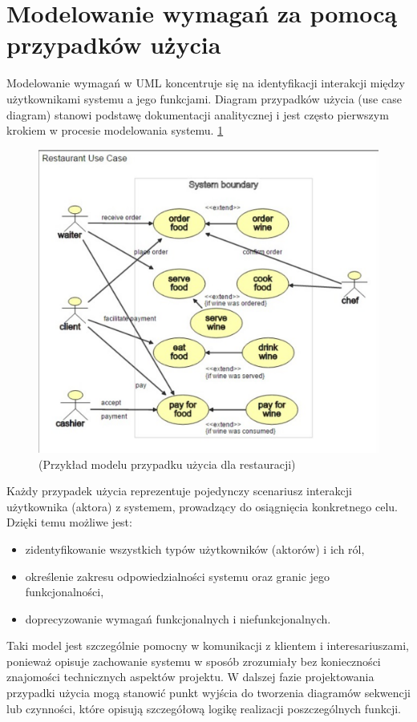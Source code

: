 \documentclass[12pt,a4paper]{article}
\begin{document}
\section{Modelowanie wymagań za pomocą przypadków użycia}

Modelowanie wymagań w UML koncentruje się na identyfikacji interakcji między użytkownikami systemu a jego funkcjami. Diagram przypadków użycia (use case diagram) stanowi podstawę dokumentacji analitycznej i jest często pierwszym krokiem w procesie modelowania systemu. \ref{fig:system_diagram_example}

\begin{figure}[H]
\centering
\includegraphics[width=0.5\linewidth]{system_diagram_example.png}
\caption{(Przykład modelu przypadku użycia dla restauracji)}
\label{fig:system_diagram_example}
\end{figure}

Każdy przypadek użycia reprezentuje pojedynczy scenariusz interakcji użytkownika (aktora) z systemem, prowadzący do osiągnięcia konkretnego celu. Dzięki temu możliwe jest:
\begin{itemize}
\item zidentyfikowanie wszystkich typów użytkowników (aktorów) i ich ról,
\item określenie zakresu odpowiedzialności systemu oraz granic jego funkcjonalności,
\item doprecyzowanie wymagań funkcjonalnych i niefunkcjonalnych.
\end{itemize}

Taki model jest szczególnie pomocny w komunikacji z klientem i interesariuszami, ponieważ opisuje zachowanie systemu w sposób zrozumiały bez konieczności znajomości technicznych aspektów projektu. W dalszej fazie projektowania przypadki użycia mogą stanowić punkt wyjścia do tworzenia diagramów sekwencji lub czynności, które opisują szczegółową logikę realizacji poszczególnych funkcji.
\end{document}
